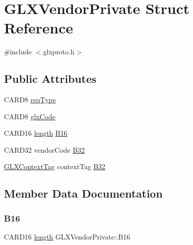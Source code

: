 \hypertarget{struct_g_l_x_vendor_private}{}\section{G\+L\+X\+Vendor\+Private Struct Reference}
\label{struct_g_l_x_vendor_private}


{\ttfamily \#include $<$glxproto.\+h$>$}

\subsection*{Public Attributes}
\begin{DoxyCompactItemize}
\item 
C\+A\+R\+D8 \hyperlink{struct_g_l_x_vendor_private_a887fa7be83229e83203cf8b1060f996e}{req\+Type}
\item 
C\+A\+R\+D8 \hyperlink{struct_g_l_x_vendor_private_a55bc64f8c72c36b676eb4cae96bc1c16}{glx\+Code}
\item 
C\+A\+R\+D16 \hyperlink{glcorearb_8h_ab9c919755bde3b34349e23a32b4e0fa7}{length} \hyperlink{struct_g_l_x_vendor_private_af9fb070121753e3c9ee70baaa9264b09}{B16}
\item 
C\+A\+R\+D32 vendor\+Code \hyperlink{struct_g_l_x_vendor_private_aaaa58138b7e5d98b4e33da5624f643e3}{B32}
\item 
\hyperlink{glxproto_8h_ae71763ce00c9fa460beb4699af678691}{G\+L\+X\+Context\+Tag} context\+Tag \hyperlink{struct_g_l_x_vendor_private_a7383e064a0e1df26f64c0819c6bb7770}{B32}
\end{DoxyCompactItemize}


\subsection{Member Data Documentation}
\mbox{\label{struct_g_l_x_vendor_private_af9fb070121753e3c9ee70baaa9264b09}} 
\subsubsection{\texorpdfstring{B16}{B16}}
{\footnotesize\ttfamily C\+A\+R\+D16 \hyperlink{glcorearb_8h_ab9c919755bde3b34349e23a32b4e0fa7}{length} G\+L\+X\+Vendor\+Private\+::\+B16}

\mbox{\label{struct_g_l_x_vendor_private_aaaa58138b7e5d98b4e33da5624f643e3}} 
